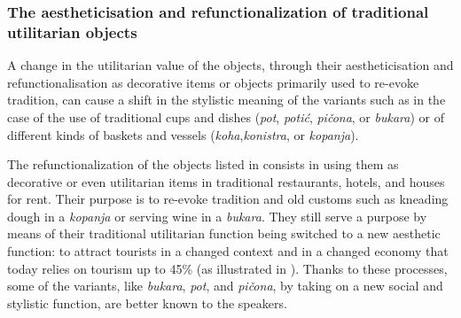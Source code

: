 \documentclass[output=paper]{LSP/langsci}
\begin{document}
\subsubsection{The aestheticisation and refunctionalization of traditional utilitarian objects}

A change in the utilitarian value of the objects, through their aestheticisation and refunctionalisation as decorative items or objects primarily used to re-evoke tradition, can cause a shift in the stylistic meaning of the variants such as in the case of the use of traditional cups and dishes (\textit{pot}, \textit{potić}, \textit{pičona}, or \textit{bukara}) or of different kinds of baskets and vessels (\textit{koha},\textit{konistra}, or \textit{kopanja}). 

\begin{table}
\caption{The aestheticisation and refunctionalization of objects}
\label{tab:skevin:6}
\end{table}

The refunctionalization of the objects listed in  consists in using them as decorative or even utilitarian items in traditional restaurants, hotels, and houses for rent. Their purpose is to re-evoke tradition and old customs such as kneading dough in a \textit{kopanja} or serving wine in a \textit{bukara}. They still serve a purpose by means of their traditional utilitarian function being switched to a new aesthetic function: to attract tourists in a changed context and in a changed economy that today relies on tourism up to 45\% (as illustrated in ). Thanks to these processes, some of the variants, like \textit{bukara}, \textit{pot}, and \textit{pičona}, by taking on a new social and stylistic function, are better known to the speakers. 
\end{document}

